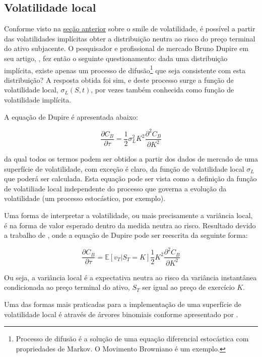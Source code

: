 \documentclass[]{book}
\let\rmarkdownfootnote\footnote%
\def\footnote{\protect\rmarkdownfootnote}
\theoremstyle{definition}
\theoremstyle{definition}
\theoremstyle{definition}
\theoremstyle{remark}
\begin{document}
\hypertarget{volatilidade-local}{%
\subsection{Volatilidade local}\label{volatilidade-local}}

Conforme visto na \protect\hyperlink{rnd}{seção anterior} sobre o smile de volatilidade, é possível a partir das volatilidades implícitas obter a distribuição neutra ao risco do preço terminal do ativo subjacente. O pesquisador e profissional de mercado Bruno Dupire em seu artigo, \citet{Dupire1994}, fez então o seguinte questionamento: dada uma distribuição implícita, existe apenas um processo de difusão\footnote{Processo de difusão é a solução de uma equação diferencial estocástica com propriedades de Markov. O Movimento Browniano é um exemplo.} que seja consistente com esta distribuição? A resposta obtida foi sim, e deste processo surge a função de volatilidade local, \(\sigma_L(S, t)\), por vezes também conhecida como função de volatilidade implícita.

A equação de Dupire é apresentada abaixo:

\[\frac{\partial C_B}{\partial \tau}=\frac{1}{2}\sigma_L^2K^2\frac{\partial^2C_B}{\partial K^2}
\label{eq:dupire}\]

da qual todos os termos podem ser obtidos a partir dos dados de mercado de uma superfície de volatilidade, com exceção é claro, da função de volatilidade local \(\sigma_L\) que poderá ser calculada. Esta equação pode ser vista como a definição da função de volatiliade local independente do processo que governa a evolução da volatilidade (um processo estocástico, por exemplo).

Uma forma de interpretar a volatilidade, ou mais precisamente a variância local, é na forma de valor esperado dentro da medida neutra ao risco. Resultado devido a trabalho de \citet{Derman1998}, onde a equação de Dupire pode ser reescrita da seguinte forma:

\[\frac{\partial C_B}{\partial \tau}=\mathbb E\left[v_T|S_T=K\right]\frac{1}{2}K^2\frac{\partial^2C_B}{\partial K^2}
\label{eq:derman}\]

Ou seja, a variância local é a expectativa neutra ao risco da variância instantânea condicionada ao preço terminal do ativo, \(S_T\) ser igual ao preço de exercício \(K\).

Uma das formas mais praticadas para a implementação de uma superfície de volatilidade local é através de árvores binomiais conforme apresentado por \citet{Derman1994}.
\end{document}
